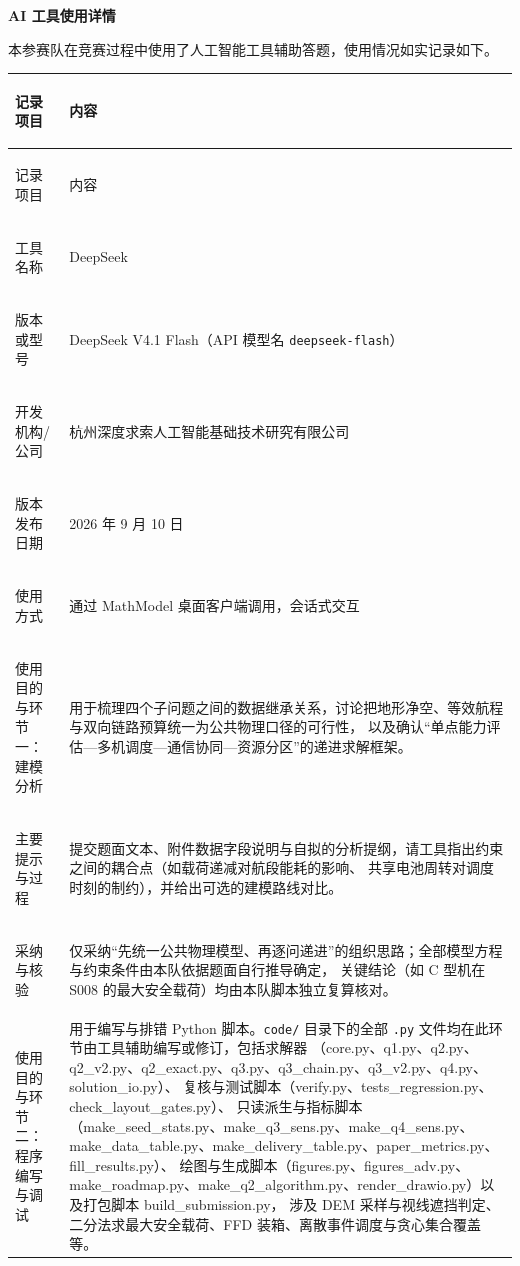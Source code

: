 \documentclass[12pt,a4paper]{ctexart}
\begin{document}
\begin{center}
	{\bfseries AI 工具使用详情}
\end{center}

\vspace{1em}
\noindent 本参赛队在竞赛过程中使用了人工智能工具辅助答题，使用情况如实记录如下。

\begin{longtable}{>{\bfseries\raggedright\arraybackslash}p{3.8cm}p{11.2cm}}
	\toprule
	记录项目 & 内容 \\
	\midrule
	\endfirsthead
	\toprule
	记录项目 & 内容 \\
	\midrule
	\endhead
	\bottomrule
	\endfoot

	工具名称 & DeepSeek \\
	版本或型号 & DeepSeek V4.1 Flash（API 模型名 \texttt{deepseek-flash}） \\
	开发机构/公司 & 杭州深度求索人工智能基础技术研究有限公司 \\
	版本发布日期 & 2026 年 9 月 10 日 \\
	使用方式 & 通过 MathModel 桌面客户端调用，会话式交互 \\
	\midrule
	使用目的与环节一：建模分析 &
	用于梳理四个子问题之间的数据继承关系，讨论把地形净空、等效航程与双向链路预算统一为公共物理口径的可行性，
	以及确认“单点能力评估—多机调度—通信协同—资源分区”的递进求解框架。 \\
	主要提示与过程 &
	提交题面文本、附件数据字段说明与自拟的分析提纲，请工具指出约束之间的耦合点（如载荷递减对航段能耗的影响、
	共享电池周转对调度时刻的制约），并给出可选的建模路线对比。 \\
	采纳与核验 &
	仅采纳“先统一公共物理模型、再逐问递进”的组织思路；全部模型方程与约束条件由本队依据题面自行推导确定，
	关键结论（如 C 型机在 S008 的最大安全载荷）均由本队脚本独立复算核对。 \\
	\midrule
	使用目的与环节二：程序编写与调试 &
	用于编写与排错 Python 脚本。\texttt{code/} 目录下的全部 \texttt{.py} 文件均在此环节由工具辅助编写或修订，包括求解器
	（core.py、q1.py、q2.py、q2\_v2.py、q2\_exact.py、q3.py、q3\_chain.py、q3\_v2.py、q4.py、solution\_io.py）、
	复核与测试脚本（verify.py、tests\_regression.py、check\_layout\_gates.py）、
	只读派生与指标脚本（make\_seed\_stats.py、make\_q3\_sens.py、make\_q4\_sens.py、make\_data\_table.py、make\_delivery\_table.py、paper\_metrics.py、fill\_results.py）、
	绘图与生成脚本（figures.py、figures\_adv.py、make\_roadmap.py、make\_q2\_algorithm.py、render\_drawio.py）以及打包脚本 build\_submission.py，
	涉及 DEM 采样与视线遮挡判定、二分法求最大安全载荷、FFD 装箱、离散事件调度与贪心集合覆盖等。 \\

\end{longtable}
\end{document}
